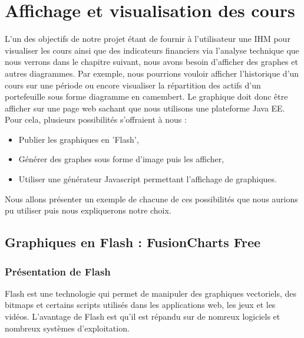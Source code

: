 \section{Affichage et visualisation des cours}


L'un des objectifs de notre projet étant de fournir à l'utilisateur une IHM pour visualiser les cours ainsi que des indicateurs financiers via l'analyse technique que nous verrons dans le chapitre suivant, nous avons besoin d'afficher des graphes et autres diagrammes.
Par exemple, nous pourrions vouloir afficher l'historique d'un cours sur une période ou encore visualiser la répartition des actifs d'un portefeuille sous forme diagramme en camembert. Le graphique doit donc être afficher sur une page web sachant que nous utilisons une plateforme Java EE.\\

Pour cela, plusieurs possibilités s'offraient à nous :
\begin{itemize}
 \item Publier les graphiques en 'Flash',
 \item Générer des graphes sous forme d'image puis les afficher,
 \item Utiliser une générateur Javascript permettant l'affichage de graphiques.
\end{itemize}

Nous allons présenter un exemple de chacune de ces possibilités que nous aurions pu utiliser puis nous expliquerons notre choix.

\subsection{Graphiques en Flash : FusionCharts Free}

\subsubsection{Présentation de Flash}
Flash est une technologie qui permet de manipuler des graphiques vectoriels, des bitmaps et certains scripts utilisés dans les applications web, les jeux et les vidéos. L'avantage de Flash est qu'il est répandu sur de nomreux logiciels et nombreux systèmes d'exploitation.\\

